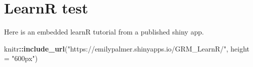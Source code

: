 \documentclass[
]{book}
\newenvironment{Shaded}{\begin{snugshade}}{\end{snugshade}}
\newcommand{\DataTypeTok}[1]{\textcolor[rgb]{0.13,0.29,0.53}{#1}}
\newcommand{\KeywordTok}[1]{\textcolor[rgb]{0.13,0.29,0.53}{\textbf{#1}}}
\newcommand{\NormalTok}[1]{#1}
\newcommand{\OperatorTok}[1]{\textcolor[rgb]{0.81,0.36,0.00}{\textbf{#1}}}
\newcommand{\StringTok}[1]{\textcolor[rgb]{0.31,0.60,0.02}{#1}}
\begin{document}
\hypertarget{learnr-test}{%
\chapter{LearnR test}\label{learnr-test}}

Here is an embedded learnR tutorial from a published shiny app.

\begin{Shaded}
\begin{Highlighting}[]
\NormalTok{knitr}\OperatorTok{::}\KeywordTok{include\_url}\NormalTok{(}\StringTok{"https://emilypalmer.shinyapps.io/GRM\_LearnR/"}\NormalTok{, }
  \DataTypeTok{height =} \StringTok{"600px"}\NormalTok{)}
\end{Highlighting}
\end{Shaded}


  
\end{document}

